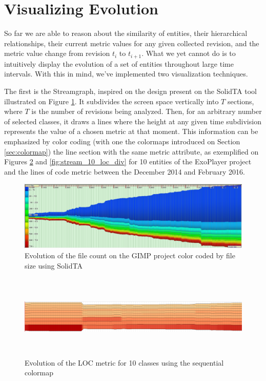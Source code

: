 \section{Visualizing Evolution} \label{sec:evolution}
So far we are able to reason about the similarity of entities, their hierarchical relationships, their current metric values for any given collected revision, and the metric value change from revision $t_{i}$ to $t_{i+1}$. What we yet cannot do is to intuitively display the evolution of a set of entities throughout large time intervals. With this in mind, we've implemented two visualization techniques.

The first is the Streamgraph, inspired on the design present on the SolidTA tool \cite{ref:solid} illustrated on Figure \ref{fig:flow_solid}. It subdivides the screen space vertically into $T$ sections, where $T$ is the number of revisions being analyzed. Then, for an arbitrary number of selected classes, it draws a lines where the height at any given time subdivision represents the  value of a chosen metric at that moment. This information can be emphasized by color coding (with one the colormaps introduced on Section \ref{sec:colormap}) the line section with the same metric attribute, as exemplified on Figures \ref{fig:stream_10_loc} and \ref{fig:stream_10_loc_div} for 10 entities of the ExoPlayer project and the lines of code metric between the December 2014 and February 2016.

\begin{figure}[H]
	\centering
	\includegraphics[width=1.0\textwidth]{figures/flow_graph.png}
	\caption{Evolution of the file count on the GIMP project color coded by file size using SolidTA}
	\label{fig:flow_solid}
\end{figure}


\begin{figure}[H]
	\centering
	\includegraphics[width=1.0\textwidth,height=4.0cm]{figures/stream_10_loc.png}
	\caption{Evolution of the LOC metric for 10 classes using the sequential colormap}
	\label{fig:stream_10_loc}
\end{figure}

